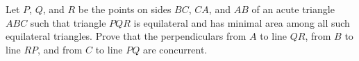 Let $ P$, $ Q$, and $ R$ be the points on sides $ BC$, $ CA$, and $ AB$ of an acute triangle $ ABC$ such that triangle $ PQR$ is equilateral and has minimal area among all such equilateral triangles. Prove that the perpendiculars from $ A$ to line $ QR$, from $ B$ to line $ RP$, and from $ C$ to line $ PQ$ are concurrent.